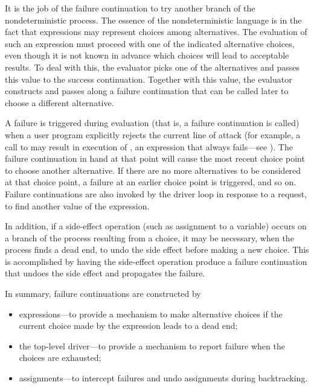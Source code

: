 It is the job of the failure continuation to try another branch of the nondeterministic process.
The essence of the nondeterministic language is in the fact that expressions may represent choices among alternatives.
The evaluation of such an expression must proceed with one of the indicated alternative choices, even though it is not known in advance which choices will lead to acceptable results.
To deal with this, the evaluator picks one of the alternatives and passes this value to the success continuation.
Together with this value, the evaluator constructs and passes along a failure continuation that can be called later to choose a different alternative.

A failure is triggered during evaluation (that is, a failure continuation is called) when a user program explicitly rejects the current line of attack (for example, a call to  may result in execution of , an expression that always fails---see ).
The failure continuation in hand at that point will cause the most recent choice point to choose another alternative.
If there are no more alternatives to be considered at that choice point, a failure at an earlier choice point is triggered, and so on.
Failure continuations are also invoked by the driver loop in response to a  request, to find another value of the expression.

In addition, if a side-effect operation (such as assignment to a variable) occurs on a branch of the process resulting from a choice, it may be necessary, when the process finds a dead end, to undo the side effect before making a new choice.
This is accomplished by having the side-effect operation produce a failure continuation that undoes the side effect and propagates the failure.

In summary, failure continuations are constructed by
\begin{itemize}

	\item
		 expressions---to provide a mechanism to make alternative choices if the current choice made by the  expression leads to a dead end;

	\item
		the top-level driver---to provide a mechanism to report failure when the choices are exhausted;

	\item
		assignments---to intercept failures and undo assignments during backtracking.

\end{itemize}

